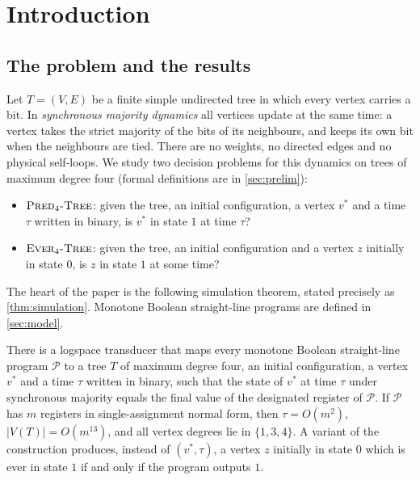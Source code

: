 \section{Introduction}\label{sec:intro}

\subsection{The problem and the results}

Let $T=(V,E)$ be a finite simple undirected tree in which every vertex carries a bit. In
\emph{synchronous majority dynamics} all vertices update at the same time: a vertex takes the strict
majority of the bits of its neighbours, and keeps its own bit when the neighbours are tied. There are
no weights, no directed edges and no physical self-loops. We study two decision problems for this
dynamics on trees of maximum degree four (formal definitions are in \cref{sec:prelim}):
\begin{itemize}
\item $\textsc{Pred}_4\textsc{-Tree}$: given the tree, an initial configuration, a vertex $v^\ast$ and a time $\tau$ written
  in binary, is $v^\ast$ in state $1$ at time $\tau$?
\item $\textsc{Ever}_4\textsc{-Tree}$: given the tree, an initial configuration and a vertex $z$ initially in state $0$, is
  $z$ in state $1$ at some time?
\end{itemize}

The heart of the paper is the following simulation theorem, stated precisely as
\cref{thm:simulation}. Monotone Boolean straight-line programs are defined in \cref{sec:model}.

\begin{mainthm}\label{thmA}
There is a logspace transducer that maps every monotone Boolean straight-line program $\mathcal P$
to a tree $T$ of maximum degree four, an initial configuration, a vertex $v^\ast$ and a time $\tau$
written in binary, such that the state of $v^\ast$ at time $\tau$ under synchronous majority equals
the final value of the designated register of $\mathcal P$. If $\mathcal P$ has $m$ registers in
single-assignment normal form, then $\tau=O(m^2)$, $|V(T)|=O(m^{13})$, and all vertex degrees lie in
$\{1,3,4\}$. A variant of the construction produces, instead of $(v^\ast,\tau)$, a vertex $z$
initially in state $0$ which is ever in state $1$ if and only if the program outputs $1$.
\end{mainthm}

